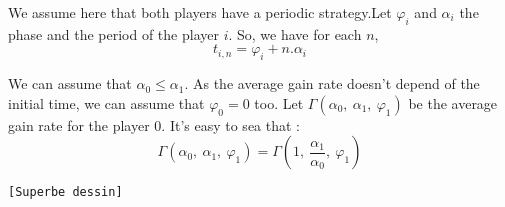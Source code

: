 We assume here that both players have a periodic strategy.Let $ \varphi_i $ and 
$ \alpha_i $ the phase and the period of the player $i$. So, we have for each $n$,
\[ t_{i,n} = \varphi_i + n.\alpha_i \]

We can assume that $\alpha_0 \leq \alpha_1 $. 
As the average gain rate doesn't depend of the initial time, we can assume that $ \varphi_0 = 0 $ too.
Let $ \Gamma\left(\alpha_0,\:\alpha_1,\:\varphi_1\right) $ be the average gain rate for the player $ 0 $.
It's easy to sea that :
\[ \Gamma\left(\alpha_0,\:\alpha_1,\:\varphi_1\right) = \Gamma\left(1,\:\frac{\alpha_1}{\alpha_0},\:\varphi_1\right) \]

\texttt{[Superbe dessin]}

